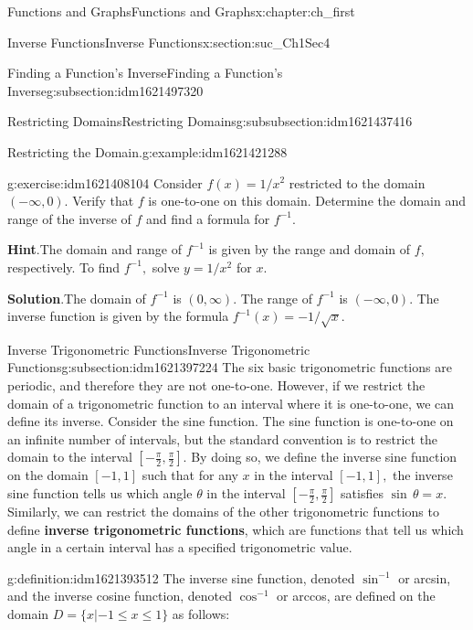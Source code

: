 \documentclass[oneside,10pt,]{book}
\newcommand{\blocktitlefont}{\relax}
\newcommand{\terminology}[1]{\textbf{#1}}
\numberwithin{equation}{section}
\begin{document}
\begin{chapterptx}{Functions and Graphs}{}{Functions and Graphs}{}{}{x:chapter:ch_first}
\begin{sectionptx}{Inverse Functions}{}{Inverse Functions}{}{}{x:section:suc_Ch1Sec4}
\begin{subsectionptx}{Finding a Function’s Inverse}{}{Finding a Function’s Inverse}{}{}{g:subsection:idm1621497320}
\begin{subsubsectionptx}{Restricting Domains}{}{Restricting Domains}{}{}{g:subsubsection:idm1621437416}
\begin{example}{Restricting the Domain.}{g:example:idm1621421288}
\end{example}
\begin{inlineexercise}{}{g:exercise:idm1621408104}%
Consider \(f(x)=1/x^2\) restricted to the domain \((-\infty ,0).\) Verify that \(f\) is one-to-one on this domain. Determine the domain and range of the inverse of \(f\) and find a formula for \(f^{-1} .\)%
\par\smallskip%
\noindent\textbf{\blocktitlefont Hint}.\hypertarget{g:hint:idm1621404136}{}\quad{}The domain and range of \(f^{-1} \) is given by the range and domain of \(f,\) respectively. To find \(f^{-1} ,\) solve \(y=1/x^2\) for \(x.\)%
\par\smallskip%
\noindent\textbf{\blocktitlefont Solution}.\hypertarget{g:solution:idm1621401064}{}\quad{}The domain of \(f^{-1} \) is \((0,\infty ).\) The range of \(f^{-1} \) is \((-\infty ,0).\) The inverse function is given by the formula \(f^{-1} (x)=-1/\sqrt{x}.\)%
\end{inlineexercise}%
\end{subsubsectionptx}
\end{subsectionptx}
%
%
\typeout{************************************************}
\typeout{************************************************}
%
\begin{subsectionptx}{Inverse Trigonometric Functions}{}{Inverse Trigonometric Functions}{}{}{g:subsection:idm1621397224}
The six basic trigonometric functions are periodic, and therefore they are not one-to-one. However, if we restrict the domain of a trigonometric function to an interval where it is one-to-one, we can define its inverse. Consider the sine function. The sine function is one-to-one on an infinite number of intervals, but the standard convention is to restrict the domain to the interval \([- \frac{\pi}{2},\frac{\pi}{2}].\) By doing so, we define the inverse sine function on the domain \([-1,1]\) such that for any \(x\) in the interval \([-1,1],\) the inverse sine function tells us which angle \(\theta \) in the interval \([-\frac{\pi}{2},\frac{\pi}{2}]\) satisfies \(\sin\,\theta =x.\) Similarly, we can restrict the domains of the other trigonometric functions to define \terminology{inverse trigonometric functions}, which are functions that tell us which angle in a certain interval has a specified trigonometric value.%
\begin{definition}{}{g:definition:idm1621393512}%
The inverse sine function, denoted \(\sin^{-1} \) or arcsin, and the inverse cosine function, denoted \(\cos^{-1}\) or arccos, are defined on the domain \(D=\{x|-1\leq  x\leq  1\}\) as follows:%

\end{definition}
\end{subsectionptx}
\end{sectionptx}
\end{chapterptx}
\end{document}
